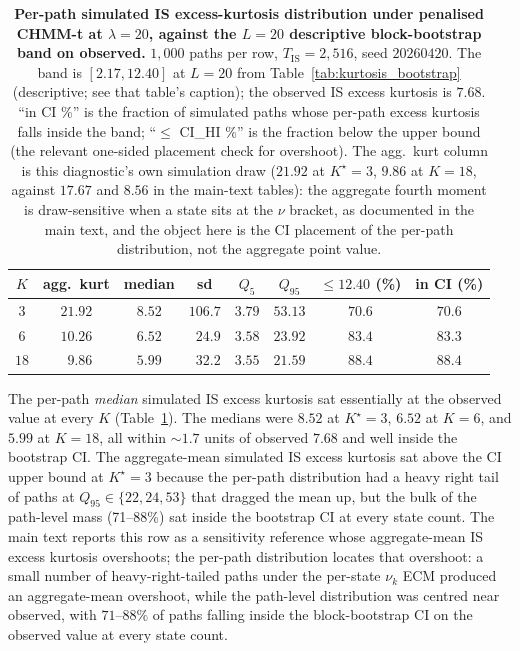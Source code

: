 \begin{table}[!ht]
\centering
\small
\caption{\textbf{Per-path simulated IS excess-kurtosis distribution under penalised CHMM-t at $\lambda = 20$, against the $L = 20$ descriptive block-bootstrap band on observed.} $1{,}000$ paths per row, $T_{\text{IS}} = 2{,}516$, seed $20260420$. The band is $[2.17, 12.40]$ at $L = 20$ from Table~\ref{tab:kurtosis_bootstrap} (descriptive; see that table's caption); the observed IS excess kurtosis is $7.68$. ``in CI \%'' is the fraction of simulated paths whose per-path excess kurtosis falls inside the band; ``$\le$ CI\_HI \%'' is the fraction below the upper bound (the relevant one-sided placement check for overshoot). The agg.\ kurt column is this diagnostic's own simulation draw ($21.92$ at $K^\star = 3$, $9.86$ at $K = 18$, against $17.67$ and $8.56$ in the main-text tables): the aggregate fourth moment is draw-sensitive when a state sits at the $\nu$ bracket, as documented in the main text, and the object here is the CI placement of the per-path distribution, not the aggregate point value.}
\label{tab:kurtosis_ci_placement}
\begin{tabular}{c c c c c c c c}
\toprule
$K$ & agg.\ kurt & median & sd & $Q_5$ & $Q_{95}$ & $\le 12.40$ (\%) & in CI (\%) \\
\midrule
$3$  & $21.92$ & $8.52$ & $106.7$ & $3.79$ & $53.13$ & $70.6$ & $70.6$ \\
$6$  & $10.26$ & $6.52$ & $\phantom{0}24.9$ & $3.58$ & $23.92$ & $83.4$ & $83.3$ \\
$18$ & $\phantom{0}9.86$ & $5.99$ & $\phantom{0}32.2$ & $3.55$ & $21.59$ & $88.4$ & $88.4$ \\
\bottomrule
\end{tabular}
\end{table}

The per-path \emph{median} simulated IS excess kurtosis sat essentially at the observed value at every $K$ (Table~\ref{tab:kurtosis_ci_placement}). The medians were $8.52$ at $K^\star = 3$, $6.52$ at $K = 6$, and $5.99$ at $K = 18$, all within $\sim 1.7$ units of observed $7.68$ and well inside the bootstrap CI. The aggregate-mean simulated IS excess kurtosis sat above the CI upper bound at $K^\star = 3$ because the per-path distribution had a heavy right tail of paths at $Q_{95} \in \{22, 24, 53\}$ that dragged the mean up, but the bulk of the path-level mass (71--88\%) sat inside the bootstrap CI at every state count. The main text reports this row as a sensitivity reference whose aggregate-mean IS excess kurtosis overshoots; the per-path distribution locates that overshoot: a small number of heavy-right-tailed paths under the per-state $\nu_k$ ECM produced an aggregate-mean overshoot, while the path-level distribution was centred near observed, with $71$--$88\%$ of paths falling inside the block-bootstrap CI on the observed value at every state count.

